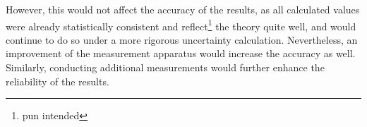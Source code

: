However, this would not affect the accuracy of the results, as all calculated values were already statistically consistent and reflect\footnote{pun intended} the theory quite well, and would continue to do so under a more rigorous uncertainty calculation.
Nevertheless, an improvement of the measurement apparatus would increase the accuracy as well. Similarly, conducting additional measurements would further enhance the reliability of the results.